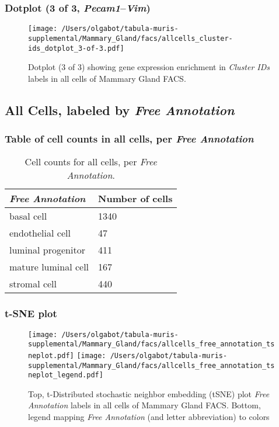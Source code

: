 \clearpage

\subsubsection{Dotplot (3 of 3, \emph{Pecam1}--\emph{Vim})}
\begin{figure}[h]
\centering
\texttt{[image: /Users/olgabot/tabula-muris-supplemental/Mammary\_Gland/facs/allcells\_cluster-ids\_dotplot\_3-of-3.pdf]}

\caption{ Dotplot (3 of 3)  showing gene expression enrichment in \emph{Cluster IDs} labels in all cells of Mammary Gland FACS. }
\end{figure}


\clearpage

\subsection{All Cells, labeled by \emph{Free Annotation}}
\subsubsection{Table of cell counts in all cells, per \emph{Free Annotation}}\begin{table}[h]
\centering
\label{my-label}
\begin{tabular}{@{}ll@{}}
\toprule

\emph{Free Annotation}& Number of cells \\ \midrule
basal cell & 1340 \\

endothelial cell & 47 \\

luminal progenitor & 411 \\

mature luminal cell & 167 \\

stromal cell & 440 \\
\bottomrule
\end{tabular}
\caption{Cell counts for all cells, per \emph{Free Annotation}.}
\end{table}

\clearpage
\subsubsection{t-SNE plot}
\begin{figure}[h]
\centering
\texttt{[image: /Users/olgabot/tabula-muris-supplemental/Mammary\_Gland/facs/allcells\_free\_annotation\_tsneplot.pdf]}
\texttt{[image: /Users/olgabot/tabula-muris-supplemental/Mammary\_Gland/facs/allcells\_free\_annotation\_tsneplot\_legend.pdf]}
\caption{Top, t-Distributed stochastic neighbor embedding (tSNE) plot  \emph{Free Annotation} labels in all cells of Mammary Gland FACS. Bottom, legend mapping \emph{Free Annotation} (and letter abbreviation) to colors}
\end{figure}



